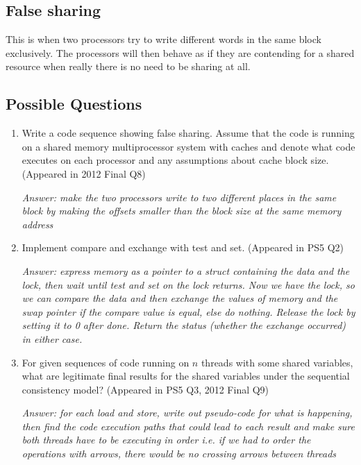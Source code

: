 \documentclass{article}
\begin{document}
\subsection{False sharing}

This is when two processors try to write different words in the same block exclusively. The processors will then behave as if they are contending for a shared resource when really there is no need to be sharing at all.

\subsection{Possible Questions}

\begin{enumerate}

\item Write a code sequence showing false sharing. Assume that the code is running on a shared memory multiprocessor system with caches and denote what code executes on each processor and any assumptions about cache block size. (Appeared in 2012 Final Q8)

\textit{Answer: make the two processors write to two different places in the same block by making the offsets smaller than the block size at the same memory address}

\item Implement compare and exchange with test and set. (Appeared in PS5 Q2)

\textit{Answer: express memory as a pointer to a struct containing the data and the lock, then wait until test and set on the lock returns. Now we have the lock, so we can compare the data and then exchange the values of memory and the swap pointer if the compare value is equal, else do nothing. Release the lock by setting it to 0 after done. Return the status (whether the exchange occurred) in either case.}

\item For given sequences of code running on $n$ threads with some shared variables, what are legitimate final results for the shared variables under the sequential consistency model? (Appeared in PS5 Q3, 2012 Final Q9)

\textit{Answer: for each load and store, write out pseudo-code for what is happening, then find the code execution paths that could lead to each result and make sure both threads have to be executing in order i.e. if we had to order the operations with arrows, there would be no crossing arrows between threads}


\end{enumerate}
\end{document}
